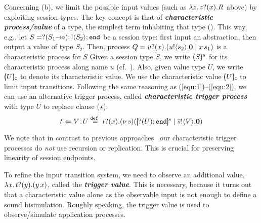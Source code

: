 Concerning (b), we limit the possible 
input values (such as $\lambda z.\,z ? (x) . R$ above) %
by exploiting session types.
The key concept is that of {\bf \emph{characteristic process/value}}
of a type,  
the 
simplest term inhabiting that type ().
This way, e.g., let $S = ? (S_1\!\! \rightarrow\!\! \diamond) ; ! \langle S_2 \rangle ; \mathtt{end}$
be a session type: first
input an abstraction, %
then output a value of type $S_2$.
Then, process $Q = u ? (x) . (u ! \langle s_2 \rangle . \mathbf{0} \;|\; x\, {s_1})$
is a characteristic process for $S$ 
Given a session type $S$, we write $[\!\!(S)\!\!]^{u} $
for its characteristic process along name $u$
(cf.~).
Also, %
given value type $U$, we write 
$[\!\!(U)\!\!]_{\mathsf{c}}$ to denote its characteristic value.
We use the %
 characteristic value %
$[\!\!(U)\!\!]_{\mathsf{c}}$
 to limit input transitions.
Following the same reasoning as (\ref{equ:1})--(\ref{equ:2}), 
we can use an alternative trigger process, called
{\bf\em characteristic trigger process} with type 
$U$ to replace clause
($\star$): %
\begin{equation}
	\label{eq:4}
	t \Leftarrow V \! : \! U \stackrel{\mathtt{def}\ }{=} t ? (x) . (\nu\, s)([\!\![? (U) ; \mathtt{end}]\!\!]^{s} \;|\; \overline{s} ! \langle V \rangle . \mathbf{0})
\end{equation}

\noi 
{}
We note that 
in contrast to previous approaches~\cite{SaWabook,JeffreyR05} 
our %
 characteristic trigger processes 
do {\em not} use recursion or 
replication. This is crucial for preserving linearity of session endpoints.  


To refine the input transition system, we need to observe 
an additional value, 
$\lambda {x}.\,t ? (y) . (y\, {{x}})$, 
called the {\bf\em trigger value}. 
This is necessary, because it turns out
that a characteristic value 
alone as the observable input 
is not enough to define a sound bisimulation.
Roughly speaking, the trigger value is used
to observe/simulate application processes.



